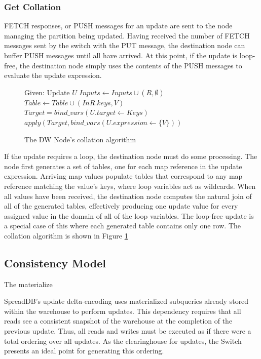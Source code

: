 \documentclass{sig-alternate}
\begin{document}
\subsubsection{Get Collation}

FETCH responses, or PUSH messages for an update are sent to the node managing the partition being updated.  Having received the number of FETCH messages sent by the switch with the PUT message, the destination node can buffer PUSH messages until all have arrived.  At this point, if the update is loop-free, the destination node simply uses the contents of the PUSH messages to evaluate the update expression.

\begin{figure}
\begin{algorithmic}[1]
\STATE Given: Update $U$
	\STATE $Inputs \leftarrow Inputs \cup (R, \emptyset)$
\ENDFOR
{}
			\STATE $Table \leftarrow Table \cup (InR.keys, V)$
		\ENDIF
	\ENDFOR
\ENDFOR
{}
	\STATE $Target = bind\_vars(U.target \leftarrow Keys)$
	\STATE $apply(Target, bind\_vars(U.expression \leftarrow \{V\}))$
\ENDFOR
\end{algorithmic}
\caption{The DW Node's collation algorithm}
\label{alg:collation}
\end{figure}

If the update requires a loop, the destination node must do some processing.  The node first generates a set of tables, one for each map reference in the update expression.  Arriving map values populate tables that correspond to any map reference matching the value's keys, where loop variables act as wildcards.  When all values have been received, the destination node computes the natural join of all of the generated tables, effectively producing one update value for every assigned value in the domain of all of the loop variables.  The loop-free update is a special case of this where each generated table contains only one row.  The collation algorithm is shown in Figure \ref{alg:collation}

\subsection{Consistency Model}

The materialize

SpreadDB's update delta-encoding uses materialized subqueries already stored within the warehouse to perform updates.  This dependency requires that all reads see a consistent snapshot of the warehouse at the completion of the previous update.  Thus, all reads and writes must be executed as if there were a total ordering over all updates.  As the clearinghouse for updates, the Switch presents an ideal point for generating this ordering.  
\end{document}
